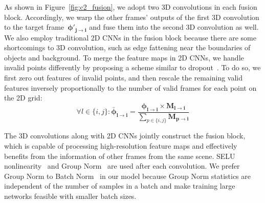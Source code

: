 As shown in Figure~\ref{fig:c2_fusion}, we adopt two 3D convolutions in each fusion block. Accordingly, we warp the other frames' outputs of the first 3D convolution to the target frame~$\boldsymbol{\phi'_{j \rightarrow i}}$ and fuse them into the second 3D convolution as well. We also employ traditional 2D CNNs in the fusion block because there are some shortcomings to 3D convolution, such as edge fattening near the boundaries of objects and background. To merge the feature maps in 2D CNNs, we handle invalid points differently by proposing a scheme similar to dropout~\cite{srivastava2014dropout}. To do so, we first zero out features of invalid points, and then rescale the remaining valid features inversely proportionally to the number of valid frames for each point on the 2D grid:
\begin{equation}\label{eqn:rescaling}
\forall l \in \{i,j\}: \boldsymbol{\bar{\phi}_{l \rightarrow i}} = \frac{\boldsymbol{\phi_{l \rightarrow i}} \times \boldsymbol{M_{l \rightarrow i}}}{\displaystyle{\sum_{p \in \{i,j\}} \! \! \! \boldsymbol{M_{p \rightarrow i}}}}
\end{equation}

The 3D convolutions along with 2D CNNs jointly construct the fusion block, which is capable of processing high-resolution feature maps and effectively benefits from the information of other frames from the same scene. SELU nonlinearity~\cite{klambauer2017self} and Group Norm~\cite{wu2018group} are used after each convolution. We prefer Group Norm to Batch Norm~\cite{ioffe2015batch} in our model because Group Norm statistics are independent of the number of samples in a batch and make training large networks feasible with smaller batch sizes.

